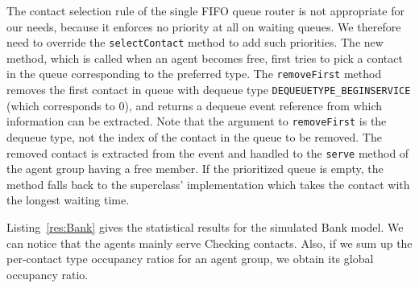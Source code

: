 The contact selection rule of the single FIFO queue router is not
appropriate for our needs, because it enforces no priority at all on
waiting queues.  We therefore need to override the
\texttt{select\-Contact} method to add such priorities.
The new method, which is called when an agent becomes free,
first tries to pick a contact in the queue corresponding to the
preferred type.  The \texttt{remove\-First} method removes the first
contact in queue with dequeue type \texttt{DEQUEUETYPE\_BEGINSERVICE}
(which corresponds to 0), and returns a dequeue event
reference from which information can be
extracted.  Note that the argument to \texttt{remove\-First} is the
dequeue type, not the index of the contact in the queue to be removed.
The
removed contact is extracted from the event and handled to the
\texttt{serve} method of the agent group having a free member.
If the prioritized queue is empty, the method falls back to the
superclass' implementation which takes the contact with the longest
waiting time.

Listing~\ref{res:Bank} gives the statistical results for the
simulated Bank model.  We can notice that the agents mainly serve
Checking contacts.  Also, if we sum up the per-contact type occupancy
ratios for an agent group, we obtain its global occupancy ratio.



